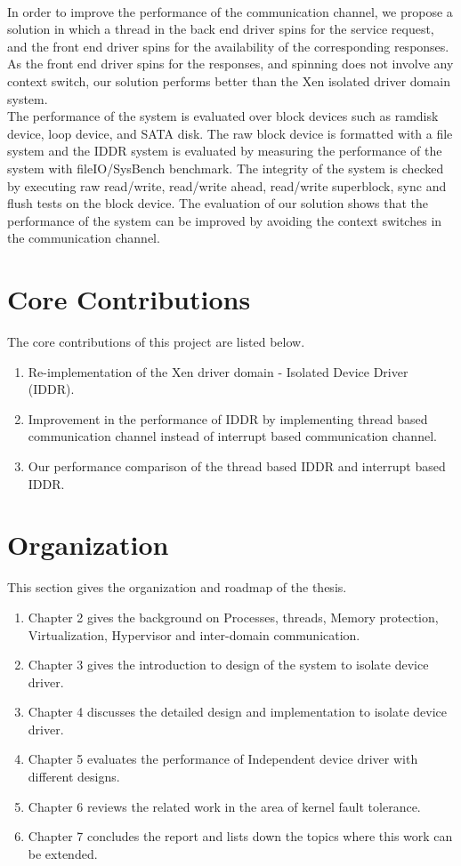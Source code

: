 \\[3mm]
In order to improve the performance of the communication channel, we propose a solution in which a thread in the back end driver spins for the service request, and the front end driver spins for the availability of the corresponding responses. As the front end driver spins for the responses, and spinning does not involve any context switch, our solution performs better than the Xen isolated driver domain system.
\\[3mm]
The performance of the system is evaluated over block devices such as ramdisk device, loop device, and SATA disk. The raw block device is formatted with a file system and the IDDR system is evaluated by measuring the performance of the system with fileIO/SysBench benchmark. The integrity of the system is checked by executing raw read/write, read/write ahead, read/write superblock, sync and flush tests on the block device. The evaluation of our solution shows that the performance of the system can be improved by avoiding the context switches in the communication channel. 
 \pagebreak

\section{Core Contributions}
The core contributions of this project are listed below. 
\begin{enumerate}
\item Re-implementation of the Xen driver domain - Isolated Device Driver (IDDR).
\item Improvement in the performance of IDDR by implementing thread based communication channel instead of interrupt based communication channel. 
\item Our performance comparison of the thread based IDDR and interrupt based IDDR.
\end{enumerate}

\pagebreak
\section {Organization}
This section gives the organization and roadmap of the thesis.
\begin{enumerate}
\item Chapter 2 gives the background on Processes, threads, Memory protection, Virtualization, Hypervisor and inter-domain communication.
\item Chapter 3 gives the introduction to design of the system to isolate device driver. 
\item Chapter 4 discusses the detailed design and implementation to isolate device driver. 
\item Chapter 5 evaluates the performance of Independent device driver with different designs.
\item Chapter 6 reviews the related work in the area of kernel fault tolerance.
\item Chapter 7 concludes the report and lists down the topics where this work can be extended.
\end{enumerate}

